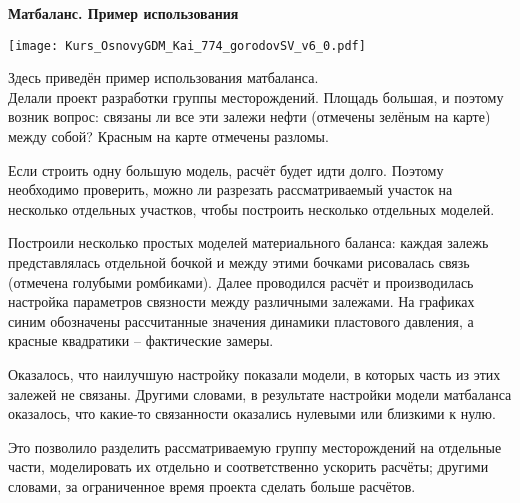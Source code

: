 \textbf{Матбаланс. Пример использования}

\texttt{[image: Kurs\_OsnovyGDM\_Kai\_774\_gorodovSV\_v6\_0.pdf]}

Здесь приведён пример использования матбаланса.
\\

Делали проект разработки группы месторождений.
Площадь большая, и поэтому возник вопрос: связаны ли все эти залежи нефти (отмечены зелёным на карте) между собой?
Красным на карте отмечены разломы.

Если строить одну большую модель, расчёт будет идти долго. Поэтому необходимо проверить, можно ли разрезать рассматриваемый участок на несколько отдельных участков, чтобы построить несколько отдельных моделей.

Построили несколько простых моделей материального баланса: каждая залежь представлялась отдельной бочкой и между этими бочками рисовалась связь (отмечена голубыми ромбиками). Далее проводился расчёт и производилась настройка параметров связности между различными залежами.
На графиках синим обозначены рассчитанные значения динамики пластового давления, а красные квадратики -- фактические замеры.

Оказалось, что наилучшую настройку показали модели, в которых часть из этих залежей не связаны.
Другими словами, в результате настройки модели матбаланса оказалось, что какие-то связанности оказались нулевыми или близкими к нулю.

Это позволило разделить рассматриваемую группу месторождений на отдельные части, моделировать их отдельно и соответственно ускорить расчёты; другими словами, за ограниченное время проекта сделать больше расчётов.

